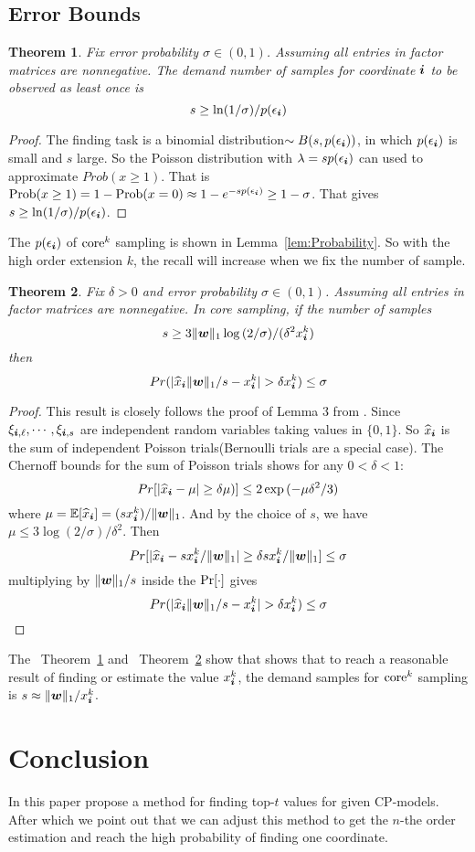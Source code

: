 \documentclass[letterpaper]{article}
\newcommand{\score}[1]{\xi_{\V{i},#1}}
\newcommand{\V}[1]{{\bm{{\MakeLowercase{#1}}}}}
\newcommand{\norm}[2]{\|#1\|_{#2}}
\newcommand{\Lem}[1]  {Lemma~\ref{lem:#1}}
\newcommand{\Theo}[1] {Theorem~\ref{theo:#1}}
\newcommand{\predx}{\widehat{x}_{\V{i}}}
\newtheorem{theorem}{Theorem}
\begin{document}
\subsection{Error Bounds}
\begin{theorem}\label{theo:ObservationBound}
Fix error probability $\sigma \in (0,1)$.
Assuming all entries in factor matrices are nonnegative.
The demand number of samples for coordinate $\V{i}$ to be observed as least once is
\[
    s \geq \ln(1/\sigma)/p(\epsilon_{\V{i}})
\]
\end{theorem}
\begin{proof}
The finding task is a binomial distribution$\sim B(s,p(\epsilon_{\V{i}}))$,
in which $p(\epsilon_{\V{i}})$ is small and $s$ large.
So the Poisson distribution with $\lambda = sp(\epsilon_{\V{i}})$
can used to approximate $Prob(x\geq1)$.
That is ${\rm Prob}(x\geq1) = 1-{\rm Prob}(x=0)\approx 1-e^{-sp(\epsilon_{\V{i}})} \geq 1-\sigma$.
That gives $s \geq \ln(1/\sigma)/p(\epsilon_{\V{i}})$.
\end{proof}
The $p(\epsilon_{\V{i}})$ of ${\rm core}^k$ sampling is shown in \Lem{Probability}.
So with the high order extension $k$, the recall will increase when we fix the number of sample.
\begin{theorem}\label{theo:Bound}
Fix $\delta > 0$ and error probability $\sigma \in (0,1)$.
Assuming all entries in factor matrices are nonnegative.
In core sampling, if the number of samples
\[
    s \geq 3\norm{\V{w}}{1}\log{(2/\sigma)}/(\delta^2 x^k_{\V{i}})
\]
then
\[
    Pr(|\predx\norm{\V{W}}{1}/s - x^k_{\V{i}}| > \delta x^k_{\V{i}}) \leq \sigma
\]
\end{theorem}

\begin{proof}
This result is closely follows the proof of Lemma 3 from \cite{BaPiKoSe15}.
Since  $ \score{\ell},\cdots,\score{s} $
are independent random variables taking values in $\{0,1\}$.
So $\predx$ is the sum of independent Poisson trials(Bernoulli trials are a special case).
The Chernoff bounds for the sum of Poisson trials shows for any $0 <\delta <1 $:
\[
    Pr[|\predx - \mu|\geq\delta\mu)] \leq 2\exp{(-\mu\delta^2/3)}
\]
where $\mu=\mathbb{E}[\predx]=(sx^k_{\V{i}})/\norm{\V{W}}{1}$.
And by the choice of $s$, we have
$\mu\leq 3\log{(2/\sigma)/\delta^2}$.
Then
\[
    Pr[|\predx-sx^k_{\V{i}}/\norm{\V{W}}{1}|\geq\delta sx^k_{\V{i}}/\norm{\V{W}}{1}] \leq \sigma
\]
multiplying by $\norm{\V{W}}{1}/s$ inside the ${\rm Pr}[\cdot]$ gives
\[
    Pr(|\predx\norm{\V{W}}{1}/s - x^k_{\V{i}}| > \delta x^k_{\V{i}}) \leq \sigma
\]
\end{proof}
The ~\Theo{ObservationBound} and ~\Theo{Bound} show that shows that
to reach a reasonable result of finding or estimate the value $x^k_{\V{i}}$,
the demand samples for ${\rm core}^k$ sampling is $s\approx \norm{\V{w}}{1}/x_{\V{i}}^k$.

\section{Conclusion}
In this paper propose a method for finding top-$t$ values for given CP-models.
After which we point out that we can adjust this method to get the $n$-the order estimation
and reach the high probability of finding one coordinate.


\end{document}
